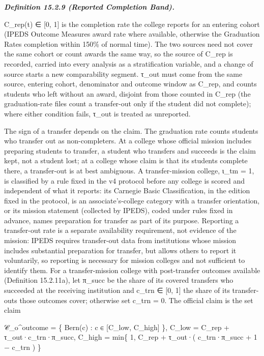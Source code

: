 \documentclass[
]{article}
\begin{document}
\emph{\textbf{Definition 15.2.9 (Reported Completion Band).}}

C\_rep(t) ∈ {[}0, 1{]} is the completion rate the college reports for an
entering cohort (IPEDS Outcome Measures award rate where available,
otherwise the Graduation Rates completion within 150\% of normal time).
The two sources need not cover the same cohort or count awards the same
way, so the source of C\_rep is recorded, carried into every analysis as
a stratification variable, and a change of source starts a new
comparability segment. τ\_out must come from the same source, entering
cohort, denominator and outcome window as C\_rep, and counts students
who left without an award, disjoint from those counted in C\_rep (the
graduation-rate files count a transfer-out only if the student did not
complete); where either condition fails, τ\_out is treated as
unreported.

The sign of a transfer depends on the claim. The graduation rate counts
students who transfer out as non-completers. At a college whose official
mission includes preparing students to transfer, a student who transfers
and succeeds is the claim kept, not a student lost; at a college whose
claim is that its students complete there, a transfer-out is at best
ambiguous. A transfer-mission college, ι\_tm = 1, is classified by a
rule fixed in the v4 protocol before any college is scored and
independent of what it reports: its Carnegie Basic Classification, in
the edition fixed in the protocol, is an associate's-college category
with a transfer orientation, or its mission statement (collected by
IPEDS), coded under rules fixed in advance, names preparation for
transfer as part of its purpose. Reporting a transfer-out rate is a
separate availability requirement, not evidence of the mission: IPEDS
requires transfer-out data from institutions whose mission includes
substantial preparation for transfer, but allows others to report it
voluntarily, so reporting is necessary for mission colleges and not
sufficient to identify them. For a transfer-mission college with
post-transfer outcomes available (Definition 15.2.11a), let π\_succ be
the share of its covered transfers who succeeded at the receiving
institution and c\_trn ∈ {[}0, 1{]} the share of its transfer-outs those
outcomes cover; otherwise set c\_trn = 0. The official claim is the set
claim

𝒞\_o\^{}outcome = \{ Bern(c) : c ∈ {[}C\_low, C\_high{]} \}, C\_low =
C\_rep + τ\_out·c\_trn·π\_succ, C\_high = min\{ 1, C\_rep + τ\_out·(
c\_trn·π\_succ + 1 − c\_trn ) \}
\end{document}
